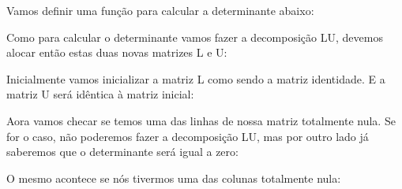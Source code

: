 Vamos definir uma função para calcular a determinante abaixo:


Como para calcular o determinante vamos fazer a decomposição LU,
devemos alocar então estas duas novas matrizes L e U:


Inicialmente vamos inicializar a matriz L como sendo a matriz
identidade. E a matriz U será idêntica à matriz inicial:


Aora vamos checar se temos uma das linhas de nossa matriz totalmente
nula. Se for o caso, não poderemos fazer a decomposição LU, mas por
outro lado já saberemos que o determinante será igual a zero:


O mesmo acontece se nós tivermos uma das colunas totalmente nula:


